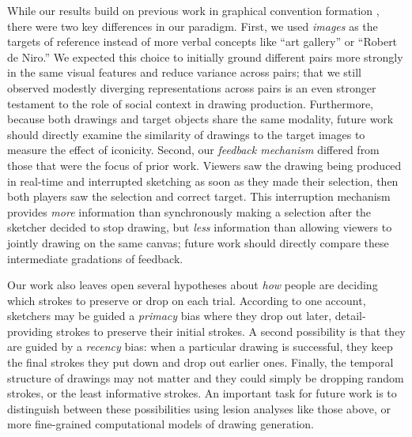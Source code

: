 \documentclass[10pt,letterpaper]{article}
\newcommand{\rdh}[1]{\textcolor{Red}{rdh: #1}}
\begin{document}
While our results build on previous work in graphical convention formation \cite{garrod_foundations_2007,fay2010interactive}, there were two key differences in our paradigm.
First, we used \emph{images} as the targets of reference instead of more verbal concepts like ``art gallery'' or ``Robert de Niro.''
We expected this choice to initially ground different pairs more strongly in the same visual features and reduce variance across pairs; that we still observed modestly diverging representations across pairs is an even stronger testament to the role of social context in drawing production.
Furthermore, because both drawings and target objects share the same modality, future work should directly examine the similarity of drawings to the target images to measure the effect of iconicity.
Second, our \emph{feedback mechanism} differed from those that were the focus of prior work.
Viewers saw the drawing being produced in real-time and interrupted sketching as soon as they made their selection, then both players saw the selection and correct target.
This interruption mechanism provides \emph{more} information than synchronously making a selection after the sketcher decided to stop drawing, but \emph{less} information than allowing viewers to jointly drawing on the same canvas; future work should directly compare these intermediate gradations of feedback.

Our work also leaves open several hypotheses about \emph{how} people are deciding which strokes to preserve or drop on each trial.
According to one account, sketchers may be guided a \emph{primacy} bias where they drop out later, detail-providing strokes to preserve their initial strokes.
A second possibility is that they are guided by a \emph{recency} bias: when a particular drawing is successful, they keep the final strokes they put down and drop out earlier ones.
Finally, the temporal structure of drawings may not matter and they could simply be dropping random strokes, or the least informative strokes.
An important task for future work is to distinguish between these possibilities using lesion analyses like those above, or more fine-grained computational models of drawing generation.
\end{document}
